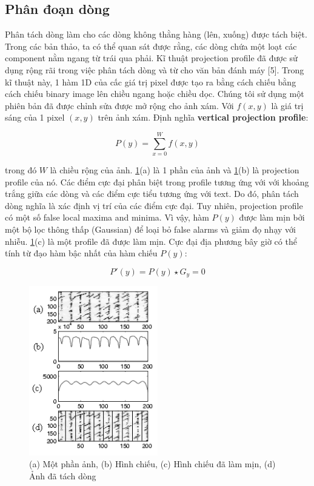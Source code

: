 \documentclass[a4paper]{article}
\begin{document}
\subsection{Phân đoạn dòng}
Phân tách dòng làm cho các dòng không thằng hàng (lên, xuống) được tách biệt. Trong các bản thảo, ta có thể quan sát được rằng, các dòng chứa một loạt các component nằm ngang từ trái qua phải. Kĩ thuật projection profile đã được sử dụng rộng rãi trong việc phân tách dòng và từ cho văn bản đánh máy [5]. Trong kĩ thuật này, 1 hàm 1D của cấc giá trị pixel được tạo ra bằng cách chiếu bằng cách chiếu binary image lên chiều ngang hoặc chiều dọc. Chúng tôi sử dụng một phiên bản đã được chỉnh sửa được mở rộng cho ảnh xám. Với $f(x, y)$  là giá trị sáng của 1 pixel $(x, y)$ trên ảnh xám. Định nghĩa \textbf{vertical projection profile}:

\begin{equation}
    P(y) = \sum ^W_{x = 0}f(x, y)
\end{equation}

trong đó $W$ là chiều rộng của ảnh. \ref{fig:fig1}(a) là 1 phần của ảnh và \ref{fig:fig1}(b) là projection profile của nó. Các điểm cực đại phân biệt trong profile tương ứng với với khoảng trắng giữa các dòng và các điểm cực tiểu tương ứng với text. Do đó, phân tách dòng nghĩa là xác định vị trí của các điểm cực đại. Tuy nhiên, projection profile có một số false local maxima and minima. Vì vậy, hàm $P(y)$ được làm mịn bởi một bộ lọc thông thấp (Gaussian) để loại bỏ false alarms và giảm đọ nhạy với nhiễu. \ref{fig:fig1}(c) là một profile đã được làm mịn. Cực đại địa phương bây giờ có thể tính từ đạo hàm bậc nhất của hàm chiếu $P(y)$:

\begin{equation}
    P'(y) = P(y) \star G_y = 0
\end{equation}

\begin{figure}
    \centering
    \includegraphics[width=0.5\textwidth]{fig1.png}
    \caption{(a) Một phần ảnh, (b) Hình chiếu, (c) Hình chiếu đã làm mịn, (d) Ảnh đã tách dòng}
    \label{fig:fig1}
\end{figure}
\end{document}
